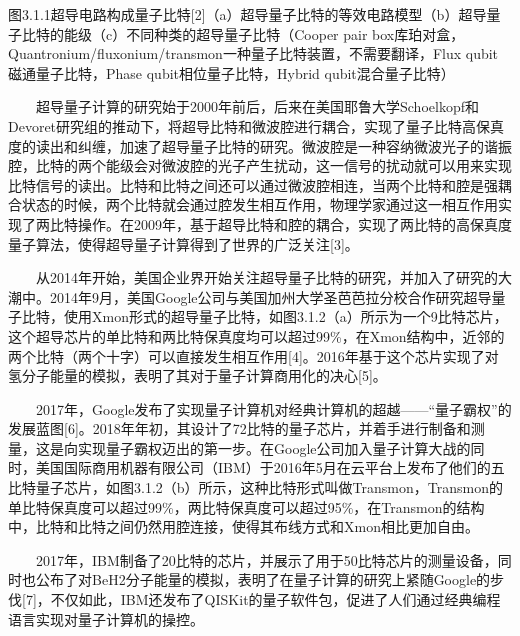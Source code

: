 \documentclass[a4paper,11pt,english]{sphinxmanual}
\begin{document}

\begin{center}图3.1.1超导电路构成量子比特{[}2{]}（a）超导量子比特的等效电路模型（b）超导量子比特的能级（c）不同种类的超导量子比特（Cooper pair box\sphinxhyphen{}库珀对盒，Quantronium/fluxonium/transmon\sphinxhyphen{}一种量子比特装置，不需要翻译，Flux qubit\sphinxhyphen{}磁通量子比特，Phase qubit\sphinxhyphen{}相位量子比特，Hybrid qubit\sphinxhyphen{}混合量子比特）
\end{center}
\sphinxAtStartPar
  超导量子计算的研究始于2000年前后，后来在美国耶鲁大学Schoelkopf和Devoret研究组的推动下，将超导比特和微波腔进行耦合，实现了量子比特高保真度的读出和纠缠，加速了超导量子比特的研究。微波腔是一种容纳微波光子的谐振腔，比特的两个能级会对微波腔的光子产生扰动，这一信号的扰动就可以用来实现比特信号的读出。比特和比特之间还可以通过微波腔相连，当两个比特和腔是强耦合状态的时候，两个比特就会通过腔发生相互作用，物理学家通过这一相互作用实现了两比特操作。在2009年，基于超导比特和腔的耦合，实现了两比特的高保真度量子算法，使得超导量子计算得到了世界的广泛关注{[}3{]}。

\sphinxAtStartPar
  从2014年开始，美国企业界开始关注超导量子比特的研究，并加入了研究的大潮中。2014年9月，美国Google公司与美国加州大学圣芭芭拉分校合作研究超导量子比特，使用X\sphinxhyphen{}mon形式的超导量子比特，如图3.1.2（a）所示为一个9比特芯片，这个超导芯片的单比特和两比特保真度均可以超过99\%，在X\sphinxhyphen{}mon结构中，近邻的两个比特（两个十字）可以直接发生相互作用{[}4{]}。2016年基于这个芯片实现了对氢分子能量的模拟，表明了其对于量子计算商用化的决心{[}5{]}。

\sphinxAtStartPar
  2017年，Google发布了实现量子计算机对经典计算机的超越——“量子霸权”的发展蓝图{[}6{]}。2018年年初，其设计了72比特的量子芯片，并着手进行制备和测量，这是向实现量子霸权迈出的第一步。在Google公司加入量子计算大战的同时，美国国际商用机器有限公司（IBM）于2016年5月在云平台上发布了他们的五比特量子芯片，如图3.1.2（b）所示，这种比特形式叫做Transmon，Transmon的单比特保真度可以超过99\%，两比特保真度可以超过95\%，在Transmon的结构中，比特和比特之间仍然用腔连接，使得其布线方式和X\sphinxhyphen{}mon相比更加自由。

\sphinxAtStartPar
  2017年，IBM制备了20比特的芯片，并展示了用于50比特芯片的测量设备，同时也公布了对BeH2分子能量的模拟，表明了在量子计算的研究上紧随Google的步伐{[}7{]}，不仅如此，IBM还发布了QISKit的量子软件包，促进了人们通过经典编程语言实现对量子计算机的操控。
\end{document}
